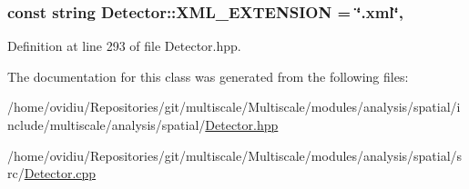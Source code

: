 \hypertarget{classmultiscale_1_1analysis_1_1Detector_a89d56e81155e57f3dcaeef293e89efc2}{
\subsubsection[{X\-M\-L\-\_\-\-E\-X\-T\-E\-N\-S\-I\-O\-N}]{\setlength{\rightskip}{0pt plus 5cm}const string Detector\-::\-X\-M\-L\-\_\-\-E\-X\-T\-E\-N\-S\-I\-O\-N = \char`\"{}.xml\char`\"{}\hspace{0.3cm}{\ttfamily [static]}, {\ttfamily [protected]}}}\label{classmultiscale_1_1analysis_1_1Detector_a89d56e81155e57f3dcaeef293e89efc2}


Definition at line 293 of file Detector.\-hpp.



The documentation for this class was generated from the following files\-:\begin{DoxyCompactItemize}
\item 
/home/ovidiu/\-Repositories/git/multiscale/\-Multiscale/modules/analysis/spatial/include/multiscale/analysis/spatial/\hyperlink{Detector_8hpp}{Detector.\-hpp}\item 
/home/ovidiu/\-Repositories/git/multiscale/\-Multiscale/modules/analysis/spatial/src/\hyperlink{Detector_8cpp}{Detector.\-cpp}\end{DoxyCompactItemize}
